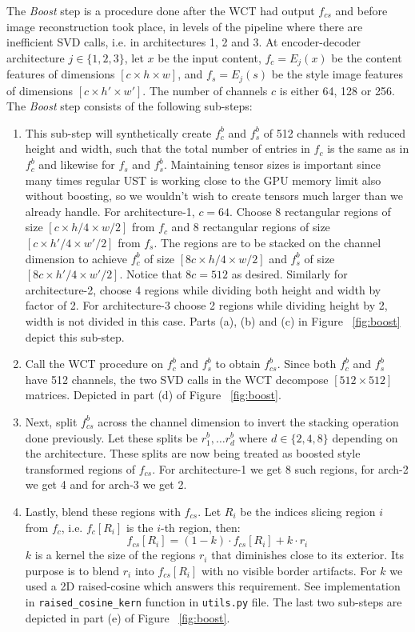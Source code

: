 The \textit{Boost} step is a procedure done after the WCT had output $f_{cs}$ and before image reconstruction took place, in levels of the pipeline where there are inefficient SVD calls, i.e. in architectures 1, 2 and 3. At encoder-decoder architecture $j\in\{1,2,3\}$, let $x$ be the input content, $f_c = E_j(x)$ be the content features of dimensions $[c \times h \times w]$, and $f_s = E_j(s)$ be the style image features of dimensions $[c \times h' \times w']$. The number of channels $c$ is either 64, 128 or 256. The \textit{Boost} step consists of the following sub-steps:
\begin{enumerate}
	\item This sub-step will synthetically create $f_c^b$ and $f_s^b$ of 512 channels with reduced height and width, such that the total number of entries in $f_c$ is the same as in $f_c^b$ and likewise for $f_s$ and $f_s^b$. Maintaining tensor sizes is important since many times regular UST is working close to the GPU memory limit also without boosting, so we wouldn't wish to create tensors much larger than we already handle. For architecture-1, $c=64$. Choose 8 rectangular regions of size $[c \times h/4 \times w/2]$ from $f_c$ and 8 rectangular regions of size $[c \times h'/4 \times w'/2]$ from $f_s$. The regions are to be stacked on the channel dimension to achieve $f_c^b$ of size $[8c \times h/4 \times w/2]$ and $f_s^b$ of size $[8c \times h'/4 \times w'/2]$. Notice that $8c=512$ as desired. Similarly for architecture-2, choose 4 regions while dividing both height and width by factor of 2. For architecture-3 choose 2 regions while dividing height by 2, width is not divided in this case. Parts (a), (b) and (c) in Figure ~\ref{fig:boost} depict this sub-step. 
	
	\item Call the WCT procedure on $f_c^b$ and $f_s^b$ to obtain $f_{cs}^b$. Since both $f_c^b$ and $f_s^b$ have 512 channels, the two SVD calls in the WCT decompose $[512\times 512]$ matrices. Depicted in part (d) of Figure ~\ref{fig:boost}.
	
	\item Next, split $f_{cs}^b$ across the channel dimension to invert the stacking operation done previously. Let these splits be $r_1^b, \dots r_d^b$ where $d\in\{2,4,8\}$ depending on the architecture. These splits are now being treated as boosted style transformed regions of $f_{cs}$. For architecture-1 we get 8 such regions, for arch-2 we get 4 and for arch-3 we get 2.
	
	\item Lastly, blend these regions with $f_{cs}$. Let $R_i$ be the indices slicing region $i$ from $f_c$, i.e. $f_c[R_i]$ is the $i$-th region, then:
	\begin{equation}
	f_{cs}[R_i] = (1-k)\cdot f_{cs}[R_i] + k\cdot r_i
	\end{equation}
	$k$ is a kernel the size of the regions $r_i$ that diminishes close to its exterior. Its purpose is to blend $r_i$ into $f_{cs}[R_i]$ with no visible border artifacts. For $k$ we used a 2D raised-cosine which answers this requirement. See implementation in \texttt{raised\_cosine\_kern} function in \texttt{utils.py} file. The last two sub-steps are depicted in part (e) of Figure ~\ref{fig:boost}.
\end{enumerate}
